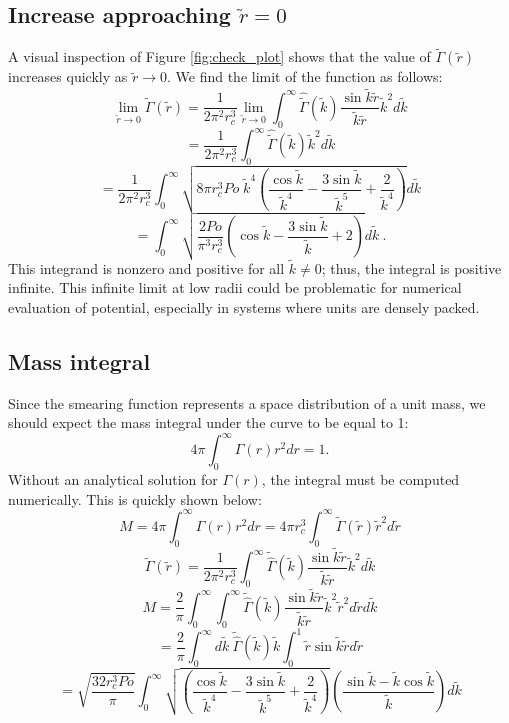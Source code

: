 \documentclass{article}
\begin{document}
\subsection{Increase approaching \(\tilde r = 0\)}
A visual inspection of Figure \ref{fig:check_plot} shows that the value of \(\tilde \Gamma(\tilde r)\) increases quickly as \(\tilde r \to 0\). We find the limit of the function as follows:
\[\lim_{\tilde r \to 0} \tilde \Gamma (\tilde r) = \frac{1}{2 \pi^2 r_c^3} \lim_{\tilde r \to 0} \int_0^\infty \hat{\tilde \Gamma}(\tilde k) \frac{\sin \tilde k \tilde r}{\tilde k \tilde r} \tilde k^2 d \tilde k\]
\[ = \frac{1}{2 \pi^2 r_c^3} \int_0^\infty \hat{\tilde \Gamma}(\tilde k)  \tilde k^2 d \tilde k\]
\[ = \frac{1}{2 \pi^2 r_c^3} \int_0^\infty \sqrt{8 \pi r_c^3 Po \; \tilde k^4 \left( \frac{\cos \tilde k}{\tilde k^4} - \frac{3 \sin \tilde k}{\tilde k^5} + \frac{2}{\tilde k^4}\right)}  d\tilde k\]
\[ = \int_0^\infty \sqrt{\frac{2Po}{\pi^3 r_c^3} \left(\cos \tilde k - \frac{3 \sin \tilde k}{\tilde k} + 2\right)}  d\tilde k \: .\]
This integrand is nonzero and positive for all \(\tilde k \neq 0\); thus, the integral is positive infinite. This infinite limit at low radii could be problematic for numerical evaluation of potential, especially in systems where units are densely packed.

\subsection{Mass integral}
Since the smearing function represents a space distribution of a unit mass, we should expect the mass integral under the curve to be equal to 1:
\[ 4\pi \int_0^\infty \Gamma(r) r^2 dr = 1.\]
Without an analytical solution for \(\Gamma(r)\),  the integral must be computed numerically. This is quickly shown below:
\[M = 4\pi \int_0^\infty \Gamma(r) r^2dr = 4 \pi r_c^3 \int_0^\infty \tilde \Gamma (\tilde r) \tilde r^2 d \tilde r\]
\[\tilde \Gamma (\tilde r) = \frac{1}{2 \pi^2 r_c^3} \int_0^\infty \tilde{\hat{\Gamma}} (\tilde k) \frac{\sin \tilde k \tilde r}{\tilde k \tilde r} \tilde k^2 d\tilde k\]
\[M = \frac{2}{\pi} \int_0^\infty \int_0^\infty \tilde{\hat{\Gamma}} (\tilde k) \frac{\sin \tilde k \tilde r}{\tilde k \tilde r} \tilde k^2 \tilde r^2 d\tilde r d\tilde k\]
\[= \frac{2}{\pi} \int_0^\infty d\tilde k \: \tilde{\hat{\Gamma}}(\tilde k) \tilde k \int_0^1 \tilde r \sin \tilde k \tilde r d\tilde r\]
\[= \sqrt{\frac{32r_c^3Po}{\pi}} \int_0^\infty \sqrt{\left( \frac{\cos \tilde k}{\tilde k^4} - \frac{3 \sin \tilde k}{\tilde k^5} + \frac{2}{\tilde k^4} \right)} \left( \frac{\sin \tilde k - \tilde k \cos \tilde k}{\tilde k} \right) d\tilde k\]
\end{document}
